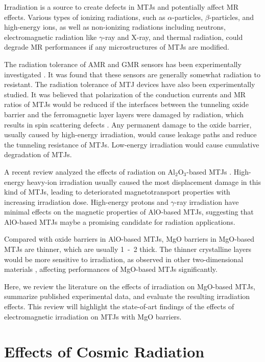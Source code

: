 \documentclass[molecules,review,submit,pdftex,moreauthors]{Definitions/mdpi}
\begin{document}
Irradiation is a source to create defects in MTJs and potentially affect MR effects.  Various types of ionizing radiations, such as $\alpha$-particles, $\beta$-particles, and high-energy ions, as well as non-ionizing radiations including neutrons, electromagnetic radiation like $\gamma$-ray and X-ray, and thermal radiation, could degrade MR performances if any microstructures of MTJs are modified.    


The radiation tolerance of AMR and GMR sensors has been experimentally investigated \cite{Michelena2010IEEE,Stutzke2005JAP,Heidecker2010IEEE}.  It was found that these sensors are generally somewhat radiation to resistant.  The radiation tolerance of MTJ devices have also been experimentally studied.  It was believed that polarization of the conduction currents and MR ratios of MTJs would be reduced if the interfaces between the tunneling oxide barrier and the ferromagnetic layer layers were damaged by radiation, which results in spin scattering defects \cite{Hass2006IEEE}.  Any permanent damage to the oxide barrier, usually caused by high-energy irradiation, would cause leakage paths and reduce the tunneling resistance of MTJs.  Low-energy irradiation would cause cumulative degradation of MTJs.


A recent review analyzed the effects of radiation on Al$_2$O$_3$-based MTJs \cite{Lu2015JMR}.  High-energy heavy-ion irradiation usually caused the most displacement damage in this kind of MTJs, leading to deteriorated magnetotransport properties with increasing irradiation dose.  High-energy protons and $\gamma$-ray irradiation have minimal effects on the magnetic properties of AlO-based MTJs, suggesting that AlO-based MTJs maybe a promising candidate for radiation applications.   


Compared with oxide barriers in AlO-based MTJs, MgO barriers in MgO-based MTJs are thinner, which are usually \unit{1 - 2}{\nano\meter} thick.  The thinner crystalline layers would be more sensitive to irradiation, as observed in other two-dimensional materials \cite{Zhao2019AS,Sze2022MM}, affecting performances of MgO-based MTJs significantly.  


Here, we review the literature on the effects of irradiation on MgO-based MTJs, summarize published experimental data, and evaluate the resulting irradiation effects.  This review will highlight the state-of-art findings of the effects of electromagnetic irradiation on MTJs with MgO barriers.


\section{Effects of Cosmic Radiation}
\end{document}
